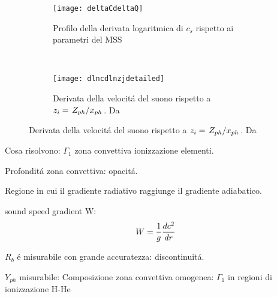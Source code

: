 \documentclass[../main.tex]{subfiles}
\begin{document}
\begin{figure}[!h]
\begin{subfigure}[r]{0.6\textwidth}
        \texttt{[image: deltaCdeltaQ]}
        \caption{Profilo della derivata logaritmica di $c_s$ rispetto ai parametri del MSS}
    \end{subfigure}
~
\begin{subfigure}[r]{0.6\textwidth}
        \texttt{[image: dlncdlnzjdetailed]}
        \caption{Derivata della velocit\'a del suono rispetto a $z_i=\midfrac{Z_{ph}}{x_{ph}}$. Da \cite{villante2014chemical}}
    \end{subfigure}
\end{figure}



\begin{workout}

Cosa risolvono: $\Gamma_1$ zona convettiva ionizzazione elementi.

\end{workout}

\begin{workout}

Profondit\'a zona convettiva: opacit\'a. 

Regione in cui il gradiente radiativo raggiunge il gradiente adiabatico.

sound speed gradient W:
\begin{equation}
W=\frac{1}{g}\TDy{r}{c^2}
\end{equation}

$R_b$ \'e misurabile con grande accuratezza: discontinuit\'a.

$Y_{ph}$ misurabile: Composizione zona convettiva omogenea:  $\Gamma_1$ in regioni di ionizzazione H-He

\end{workout}
\end{document}
